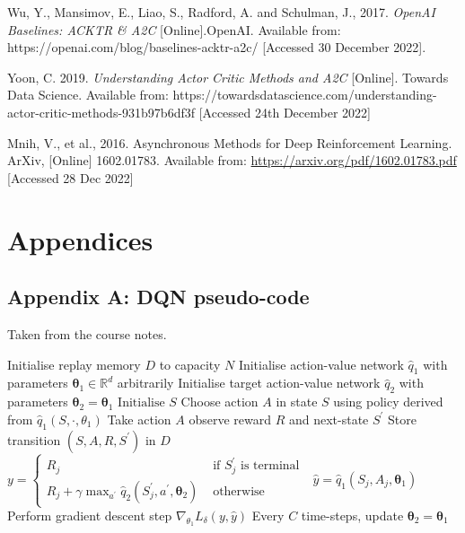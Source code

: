 \documentclass{article}
\begin{document}
Wu, Y., Mansimov, E., Liao, S., Radford, A. and Schulman, J., 2017. \emph{OpenAI Baselines: ACKTR \& A2C} [Online].OpenAI. Available from: https://openai.com/blog/baselines-acktr-a2c/ [Accessed 30 December 2022].

Yoon, C. 2019. \emph{Understanding Actor Critic Methods and A2C} [Online]. Towards Data Science. Available from: https://towardsdatascience.com/understanding-actor-critic-methods-931b97b6df3f [Accessed 24th December 2022]


\small

Mnih, V., et al., 2016. Asynchronous Methods for Deep Reinforcement Learning. ArXiv, [Online] 1602.01783.
Available from: \url{https://arxiv.org/pdf/1602.01783.pdf} [Accessed 28 Dec 2022]

\normalsize
\newpage
\section*{Appendices}
\subsection*{Appendix A: DQN pseudo-code}
\label{dqn_pseudo}
Taken from the course notes.
\begin{algorithmic}[1]
\State Initialise replay memory $D$ to capacity $N$
\State Initialise action-value network $\hat{q}_{1}$ with parameters $\boldsymbol{\theta}_{1} \in \mathbb{R}^{d}$ arbitrarily
\State Initialise target action-value network $\hat{q}_{2}$ with parameters $\boldsymbol{\theta}_{2}=\boldsymbol{\theta}_{1}$
    \State $\text{Initialise } S$
        \State Choose action $A$ in state $S$ using policy derived from  $\hat{q}_{1}\left(S, \cdot, \theta_{1}\right)$
        \State Take action $A$ observe reward $R$ and next-state $S^{\prime}$
        \State Store transition $\left(S, A, R, S^{\prime}\right)$ in $D$
            \State $y= \begin{cases}R_{j} & \text { if } S_{j}^{\prime} \text { is terminal } \\ R_{j}+\gamma \max _{a^{\prime}} \hat{q}_{2}\left(S_{j}^{\prime}, a^{\prime}, \boldsymbol{\theta}_{2}\right) & \text { otherwise }\end{cases}$
            \State $\hat{y}=\hat{q}_{1}\left(S_{j}, A_{j}, \boldsymbol{\theta}_{1}\right)$
            \State Perform gradient descent step $\nabla_{\theta_{1}} L_{\delta}(y, \hat{y})$
        \EndFor
    \State Every $C$ time-steps, update $\boldsymbol{\theta}_{2}=\boldsymbol{\theta}_{1}$
    \EndFor
\EndFor
\end{algorithmic}
\end{document}
